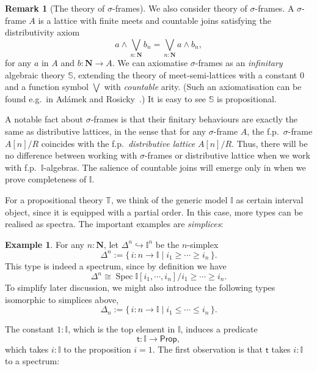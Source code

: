 \documentclass[12pt]{amsart}
\theoremstyle{definition}
\newtheorem{example}[theorem]{Example}
\newtheorem{remark}[theorem]{Remark}
\newcommand{\mb}[1]{\mathbf{#1}}
\newcommand{\mbb}[1]{\mathbb{#1}}
\newcommand{\T}{\mbb T}
\newcommand{\I}{\mbb I}
\newcommand{\ms}[1]{\mathsf{#1}}
\newcommand{\scomp}[2]{\{\,#1\mid#2\,\}}
\newcommand{\hook}{\hookrightarrow}
\newcommand{\N}{\mb N}
\newcommand{\pp}{\ms{Prop}}
\newcommand{\spec}{\operatorname{Spec}}
\begin{document}
\begin{remark}[The theory of $\sigma$-frames]\label{rem:sigmaframe}
  We also consider theory of $\sigma$-frames. A $\sigma$-frame $A$ is a lattice with finite meets and countable joins satisfying the distributivity axiom 
  \[ a \wedge \bigvee_{n:\N} b_n = \bigvee_{n:\N} a \wedge b_n, \]
  for any $a$ in $A$ and $b \colon \N \to A$. We can axiomatise $\sigma$-frames as an \emph{infinitary} algebraic theory $\mbb S$, extending the theory of meet-semi-lattices with a constant $0$ and a function symbol $\bigvee$ with \emph{countable} arity. (Such an axiomatisation can be found e.g.\ in Ad\'amek and Rosicky~\cite[Exa.~3.26]{adamek1994locally}.) It is easy to see $\mbb S$ is propositional. 

  A notable fact about $\sigma$-frames is that their finitary behaviours are exactly the same as distributive lattices, in the sense that for any $\sigma$-frame $A$, the f.p.\ $\sigma$-frame $A[n]/R$ coincides with the f.p.\ \emph{distributive lattice} $A[n]/R$. Thus, there will be no difference between working with $\sigma$-frames or distributive lattice when we work with f.p.\ $\I$-algebras. The salience of countable joins will emerge only in  when we prove completeness of $\I$.
\end{remark}

For a propositional theory $\T$, we think of the generic model $\I$ as certain interval object, since it is equipped with a partial order. In this case, more types can be realised as spectra. The important examples are \emph{simplices}:

\begin{example}\label{exm:simplicesaffine}
  For any $n : \N$, let $\Delta^n \hook \I^n$ be the $n$-simplex
  \[ \Delta^n := \scomp{i \colon n \to \I}{i_1 \ge \cdots \ge i_n}. \]
  This type is indeed a spectrum, since by definition we have
  \[ \Delta^n \cong \spec\I[i_1,\cdots,i_n]/i_1\ge\cdots\ge i_n. \]
  To simplify later discussion, we might also introduce the following types isomorphic to simplices above,
  \[ \Delta_n := \scomp{i : n \to \I}{i_1 \le \cdots \le i_n}. \]
\end{example}

The constant $1 : \I$, which is the top element in $\I$, induces a predicate
\[ \ms t \colon \I \to \pp, \]
which takes $i : \I$ to the proposition $i = 1$. The first observation is that $\ms t$ takes $i : \I$ to a spectrum:
\end{document}
